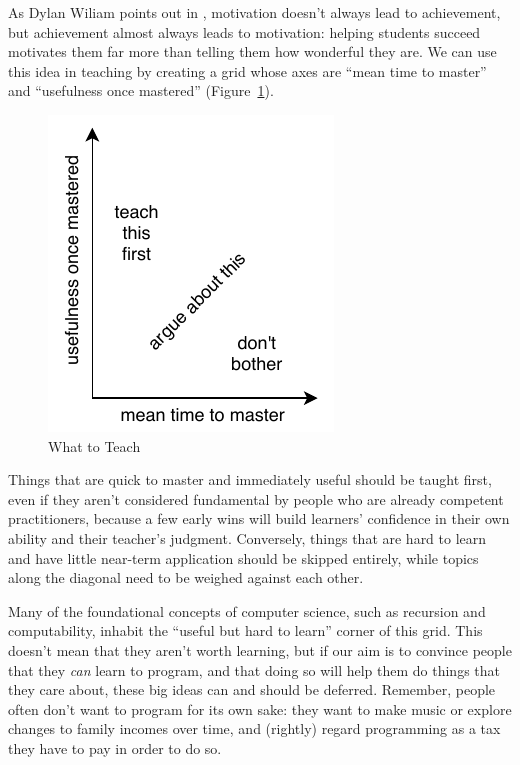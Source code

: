 As Dylan Wiliam points out in \cite{Hend2017}, motivation doesn't
always lead to achievement, but achievement almost always leads to
motivation: helping students succeed motivates them far more than
telling them how wonderful they are. We can use this idea in teaching by
creating a grid whose axes are ``mean time to master'' and ``usefulness
once mastered'' (Figure~\ref{f:motivation-what}).

\begin{figure}
\centering
\includegraphics{../../figures/what-to-teach.pdf}
\caption{What to Teach}
\label{f:motivation-what}
\end{figure}

Things that are quick to master and immediately useful should be taught
first, even if they aren't considered fundamental by people who are
already competent practitioners, because a few early wins will build
learners' confidence in their own ability and their teacher's judgment.
Conversely, things that are hard to learn and have little near-term
application should be skipped entirely, while topics along the diagonal
need to be weighed against each other.

Many of the foundational concepts of computer science, such as recursion
and computability, inhabit the ``useful but hard to learn'' corner of this
grid. This doesn't mean that they aren't worth learning, but if our aim
is to convince people that they \emph{can} learn to program, and that doing
so will help them do things that they care about, these big ideas can
and should be deferred. Remember, people often don't want to program for
its own sake: they want to make music or explore changes to family
incomes over time, and (rightly) regard programming as a tax they have
to pay in order to do so.

